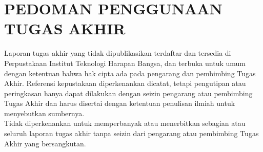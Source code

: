 
%

\chapter*{PEDOMAN PENGGUNAAN TUGAS AKHIR}
{\raggedleft Laporan tugas akhir yang tidak dipublikasikan terdaftar dan tersedia di Perpustakaan Institut Teknologi Harapan Bangsa, dan terbuka untuk umum dengan ketentuan bahwa hak cipta ada pada pengarang dan pembimbing Tugas Akhir. Referensi kepustakaan diperkenankan dicatat, tetapi pengutipan atau peringkasan hanya dapat dilakukan dengan seizin pengarang atau pembimbing Tugas Akhir dan harus disertai dengan ketentuan penulisan ilmiah untuk menyebutkan sumbernya.}\\[1.0 cm]
Tidak diperkenankan untuk memperbanyak atau menerbitkan sebagian atau seluruh laporan tugas akhir tanpa seizin dari pengarang atau pembimbing Tugas Akhir yang bersangkutan.


\newpage
